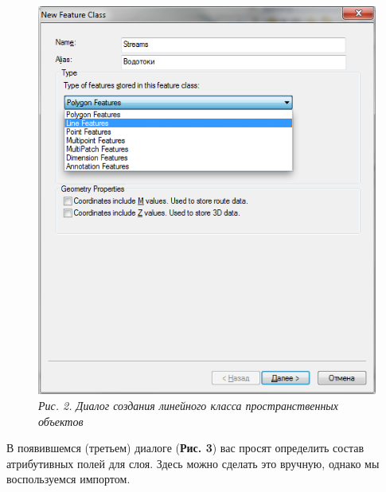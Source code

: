 \documentclass[]{book}
\theoremstyle{definition}
\theoremstyle{definition}
\theoremstyle{definition}
\theoremstyle{remark}
\begin{document}
\begin{enumerate}
  \begin{figure}
  \centering
  \includegraphics{images/Ex13/image8.png}
  \caption{\emph{Рис. 2. Диалог создания линейного класса
  пространственных объектов}}
  \end{figure}

  В появившемся (третьем) диалоге (\textbf{Рис. 3}) вас просят
  определить состав атрибутивных полей для слоя. Здесь можно сделать это
  вручную, однако мы воспользуемся импортом.


\end{enumerate}
\end{document}
